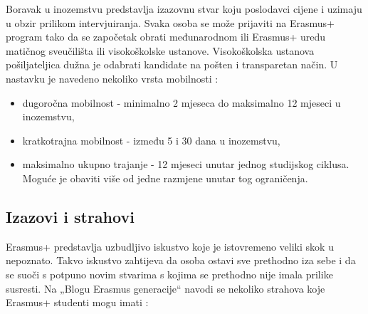 \documentclass[]{foi}
\begin{document}
Boravak u inozemstvu predstavlja izazovnu stvar koju poslodavci cijene i uzimaju u obzir prilikom intervjuiranja. 
Svaka osoba se može prijaviti na Erasmus+ program tako da se započetak obrati međunarodnom ili Erasmus+ uredu matičnog sveučilišta ili visokoškolske ustanove. 
Visokoškolska ustanova pošiljateljica dužna je odabrati kandidate na pošten i transparetan način. U nastavku je navedeno nekoliko vrsta mobilnosti \cite{erasmus2025abroad}:
\begin{itemize}
    \item dugoročna mobilnost - minimalno 2 mjeseca do maksimalno 12 mjeseci u inozemstvu,
    \item kratkotrajna mobilnost - između 5 i 30 dana u inozemstvu,
    \item maksimalno ukupno trajanje - 12 mjeseci unutar jednog studijskog ciklusa. Moguće je obaviti više od jedne razmjene unutar tog ograničenja. 
    
\end{itemize}
\subsection{Izazovi i strahovi}
Erasmus+ predstavlja uzbudljivo iskustvo koje je istovremeno veliki skok u nepoznato. Takvo iskustvo zahtijeva da osoba ostavi sve prethodno iza sebe i da se suoči s potpuno novim 
stvarima s kojima se prethodno nije imala prilike susresti. Na „Blogu Erasmus generacije“ navodi se nekoliko strahova koje Erasmus+ studenti mogu imati \cite{erasmus_fears_2025}:
\end{document}
